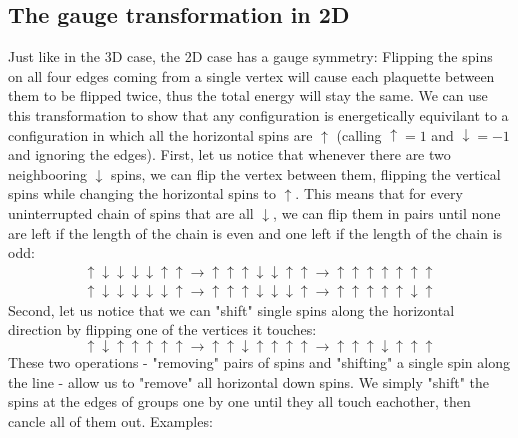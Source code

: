 \documentclass{article}
\begin{document}
\subsection{The gauge transformation in 2D}
Just like in the 3D case, the 2D case has a gauge symmetry: Flipping the spins on all four edges coming from a single vertex will cause each plaquette between them to be flipped twice, thus the total energy will stay the same. We can use this transformation to show that any configuration is energetically equivilant to a configuration in which all the horizontal spins are $\uparrow$ (calling $\uparrow = 1$ and $\downarrow = -1$ and ignoring the edges).
\newline
First, let us notice that whenever there are two neighbooring $\downarrow$ spins, we can flip the vertex between them, flipping the vertical spins while changing the horizontal spins to $\uparrow$. This means that for every uninterrupted chain of spins that are all $\downarrow$, we can flip them in pairs until none are left if the length of the chain is even and one left if the length of the chain is odd:
\begin{equation*}
\begin{gathered}
    \uparrow\downarrow\downarrow\downarrow\downarrow\uparrow\uparrow \longrightarrow 
    \uparrow\uparrow\uparrow\downarrow\downarrow\uparrow\uparrow \longrightarrow 
    \uparrow\uparrow\uparrow\uparrow\uparrow\uparrow\uparrow
    \\
    \uparrow\downarrow\downarrow\downarrow\downarrow\downarrow\uparrow \longrightarrow 
    \uparrow\uparrow\uparrow\downarrow\downarrow\downarrow\uparrow \longrightarrow 
    \uparrow\uparrow\uparrow\uparrow\uparrow\downarrow\uparrow
\end{gathered}
\end{equation*}
Second, let us notice that we can "shift" single spins along the horizontal direction by flipping one of the vertices it touches:
\begin{equation*}
    \uparrow\downarrow\uparrow\uparrow\uparrow\uparrow\uparrow \longrightarrow 
    \uparrow\uparrow\downarrow\uparrow\uparrow\uparrow\uparrow \longrightarrow 
    \uparrow\uparrow\uparrow\downarrow\uparrow\uparrow\uparrow
\end{equation*}
These two operations - "removing" pairs of spins and "shifting" a single spin along the line - allow us to "remove" all horizontal down spins. We simply "shift" the spins at the edges of groups one by one until they all touch eachother, then cancle all of them out. Examples:
\end{document}
